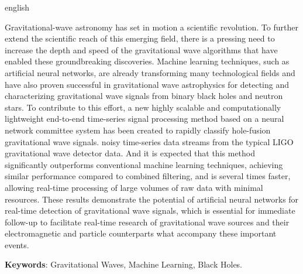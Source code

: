 \begin{resumo}[Abstract]
 \begin{otherlanguage*}{english}

Gravitational-wave astronomy has set in motion a scientific revolution. To further extend the scientific reach of this emerging field, there is a pressing need to increase the depth and speed of the gravitational wave algorithms that have enabled these groundbreaking discoveries. Machine learning techniques, such as artificial neural networks, are already transforming many technological fields and have also proven successful in gravitational wave astrophysics for detecting and characterizing gravitational wave signals from binary black holes and neutron stars. To contribute to this effort, a new highly scalable and computationally lightweight end-to-end time-series signal processing method based on a neural network committee system has been created to rapidly classify hole-fusion gravitational wave signals. noisy time-series data streams from the typical LIGO gravitational wave detector data. And it is expected that this method significantly outperforms conventional machine learning techniques, achieving similar performance compared to combined filtering, and is several times faster, allowing real-time processing of large volumes of raw data with minimal resources. These results demonstrate the potential of artificial neural networks for real-time detection of gravitational wave signals, which is essential for immediate follow-up to facilitate real-time research of gravitational wave sources and their electromagnetic and particle counterparts what accompany these important events.

\textbf{Keywords}:  Gravitational Waves, Machine Learning, Black Holes.
 \end{otherlanguage*}
\end{resumo}